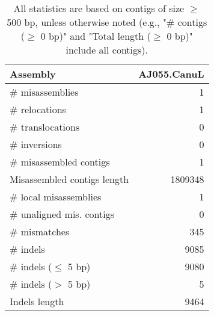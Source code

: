 \documentclass[12pt,a4paper]{article}
\begin{document}
\begin{table}[ht]
\begin{center}
\caption{All statistics are based on contigs of size $\geq$ 500 bp, unless otherwise noted (e.g., "\# contigs ($\geq$ 0 bp)" and "Total length ($\geq$ 0 bp)" include all contigs).}
\begin{tabular}{|l*{1}{|r}|}
\hline
Assembly & AJ055.CanuL \\ \hline
\# misassemblies & 1 \\ \hline
\hspace{5mm}\# relocations & 1 \\ \hline
\hspace{5mm}\# translocations & 0 \\ \hline
\hspace{5mm}\# inversions & 0 \\ \hline
\# misassembled contigs & 1 \\ \hline
Misassembled contigs length & 1809348 \\ \hline
\# local misassemblies & 1 \\ \hline
\# unaligned mis. contigs & 0 \\ \hline
\# mismatches & 345 \\ \hline
\# indels & 9085 \\ \hline
\hspace{5mm}\# indels ($\leq$ 5 bp) & 9080 \\ \hline
\hspace{5mm}\# indels ($>$ 5 bp) & 5 \\ \hline
Indels length & 9464 \\ \hline
\end{tabular}
\end{center}
\end{table}
\end{document}
